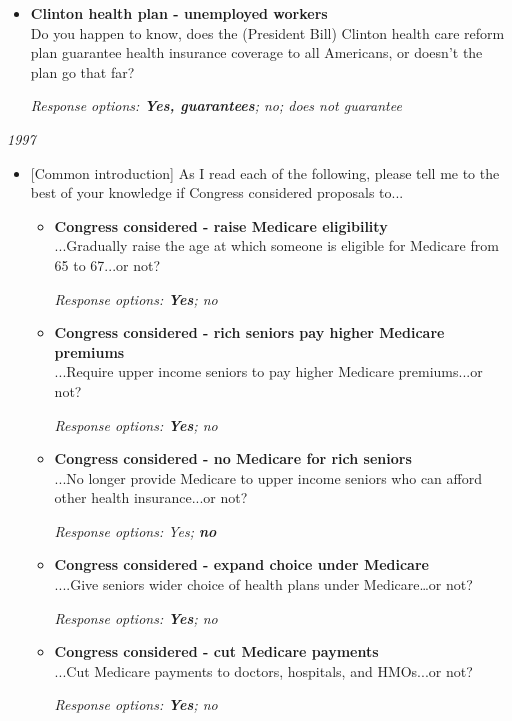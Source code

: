 \documentclass[12pt, letterpaper]{article}
\begin{document}
\begin{itemize}
\item \textbf{Clinton health plan - unemployed workers} \\
Do you happen to know, does the (President Bill) Clinton health care reform plan guarantee health insurance coverage to all Americans, or doesn't the plan go that far? 

\textit{Response options: \textbf{Yes, guarantees}; no; does not guarantee} 
\end{itemize}
  

 \large \noindent \textit{1997} 
\normalsize
\begin{itemize} \item{[Common introduction] As I read each of the following, please tell me to the best of your knowledge if Congress considered proposals to...

   \begin{itemize}
\item \textbf{Congress considered - raise Medicare eligibility} \\
...Gradually raise the age at which someone is eligible for Medicare from 65 to 67...or not?

\textit{Response options: \textbf{Yes}; no} 
\end{itemize}

   \begin{itemize}
\item \textbf{Congress considered - rich seniors pay higher Medicare premiums} \\
...Require upper income seniors to pay higher Medicare premiums...or not?

\textit{Response options: \textbf{Yes}; no} 
\end{itemize}

   \begin{itemize}
\item \textbf{Congress considered - no Medicare for rich seniors} \\
...No longer provide Medicare to upper income seniors who can afford other health insurance...or not?

\textit{Response options: Yes; \textbf{no}} 
\end{itemize}

   \begin{itemize}
\item \textbf{Congress considered - expand choice under Medicare} \\
....Give seniors wider choice of health plans under Medicare…or not?

\textit{Response options: \textbf{Yes}; no} 
\end{itemize}

   \begin{itemize}
\item \textbf{Congress considered - cut Medicare payments} \\
...Cut Medicare payments to doctors, hospitals, and HMOs...or not?

\textit{Response options: \textbf{Yes}; no} 
\end{itemize}}
\end{itemize}
\end{document}
